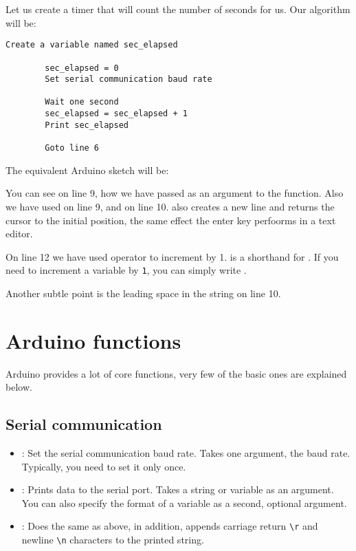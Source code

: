 \documentclass{article}
\begin{document}
		Let us create a timer that will count the number of seconds for us. Our algorithm will be:

		\begin{lstlisting}[gobble=8]
		Create a variable named sec_elapsed

		sec_elapsed = 0
		Set serial communication baud rate

		Wait one second
		sec_elapsed = sec_elapsed + 1
		Print sec_elapsed

		Goto line 6
		\end{lstlisting}

		The equivalent Arduino sketch will be:

		

		You can see on line 9, how we have passed  as an argument to the  function. Also we have used  on line 9, and  on line 10.  also creates a new line and returns the cursor to the initial position, the same effect the enter key perfoorms in a text editor.

		On line 12 we have used \inlncd{+=} operator to increment  by 1.  is a shorthand for . If you need to increment a variable by \texttt{1}, you can simply write .

		Another subtle point is the leading space in the string on line 10.

\section{Arduino functions}

	Arduino provides a lot of core functions, very few of the basic ones are explained below.

	\subsection{Serial communication}

		\begin{itemize}

			\item {}: Set the serial communication baud rate. Takes one argument, the baud rate. Typically, you need to set it only once.

			\item {}: Prints data to the serial port. Takes a string or variable as an argument. You can also specify the format of a variable as a second, optional argument.

			\item {}: Does the same as above, in addition, appends carriage return \texttt{\textbackslash{}r} and newline \texttt{\textbackslash{}n} characters to the printed string.

		\end{itemize}
\end{document}
